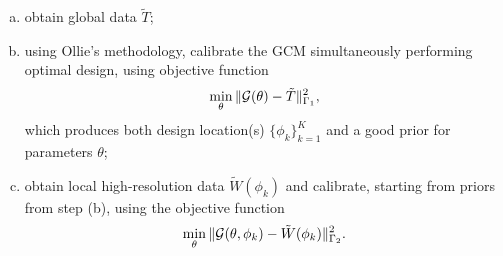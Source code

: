 \documentclass{report}
\begin{document}
\begin{enumerate}[(a)]
  \item obtain global data $\tilde{T}$;
  \item using Ollie's methodology, calibrate the GCM simultaneously performing optimal design, using objective function
    \[
      \min_\theta \| \mathcal{G}(\theta) - \tilde{T} \|_{\Gamma_1}^2,
    \]
    which produces both design location(s) $\{ \phi_k \}_{k=1}^K$ and a good prior for parameters $\theta$;
  \item obtain local high-resolution data $\tilde{W}(\phi_k)$ and calibrate, starting from priors from step (b), using the objective function
    \[
      \min_\theta \| \mathcal{G}(\theta, \phi_k) - \tilde{W}(\phi_k) \|_{\Gamma_2}^2.
    \]
\end{enumerate}
\end{document}
